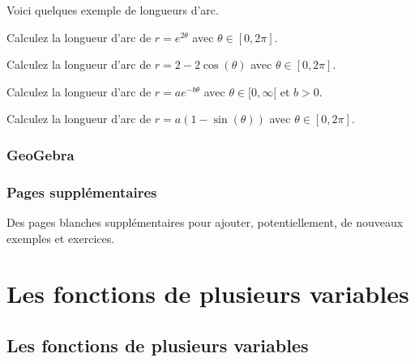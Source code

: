 \documentclass[]{book}
\theoremstyle{definition}
\theoremstyle{definition}
\theoremstyle{definition}
\theoremstyle{remark}
\let\BeginKnitrBlock\begin \let\EndKnitrBlock\end
\begin{document}
Voici quelques exemple de longueurs d'arc.

\BeginKnitrBlock{example}
\protect\hypertarget{exm:unnamed-chunk-114}{}{\label{exm:unnamed-chunk-114}
}Calculez la longueur d'arc de \(r=e^{2\theta}\) avec
\(\theta\in[0,2\pi]\).
\EndKnitrBlock{example}
\vspace*{8cm}

\BeginKnitrBlock{example}
\protect\hypertarget{exm:unnamed-chunk-115}{}{\label{exm:unnamed-chunk-115}
}Calculez la longueur d'arc de \(r=2-2\cos(\theta)\) avec
\(\theta\in[0,2\pi]\).
\EndKnitrBlock{example}
\vspace*{8cm}

\BeginKnitrBlock{example}
\protect\hypertarget{exm:unnamed-chunk-116}{}{\label{exm:unnamed-chunk-116}
}Calculez la longueur d'arc de \(r=ae^{-b\theta}\) avec
\(\theta\in[0,\infty[\) et \(b>0\).
\EndKnitrBlock{example}
\vspace*{10cm}

\BeginKnitrBlock{example}
\protect\hypertarget{exm:unnamed-chunk-117}{}{\label{exm:unnamed-chunk-117}
}Calculez la longueur d'arc de \(r=a(1-\sin(\theta))\) avec
\(\theta\in[0,2\pi]\).
\EndKnitrBlock{example}
\vspace*{8cm}

\hypertarget{geogebra-polaire}{%
\section{GeoGebra}\label{geogebra-polaire}}

\hypertarget{applet_container}{}

\newpage

\hypertarget{pages-supplementaires-2}{%
\section{Pages supplémentaires}\label{pages-supplementaires-2}}

Des pages blanches supplémentaires pour ajouter, potentiellement, de
nouveaux exemples et exercices.


\hypertarget{part-les-fonctions-de-plusieurs-variables}{%
\part{Les fonctions de plusieurs
variables}\label{part-les-fonctions-de-plusieurs-variables}}

\hypertarget{fctvar}{%
\chapter{Les fonctions de plusieurs variables}\label{fctvar}}
\end{document}
